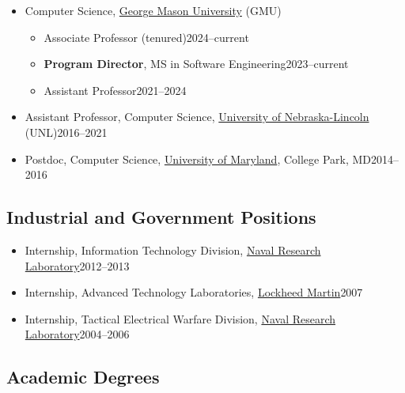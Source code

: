 \documentclass[11pt]{article}
\begin{document}
\begin{itemize}
    \item Computer Science, \href{https://cs.gmu.edu}{George Mason University} (GMU)
    \begin{itemize}
        \item Associate Professor (tenured)\hfill 2024--current
        \item \textbf{Program Director}, MS in Software Engineering\hfill 2023--current
        \item Assistant Professor\hfill 2021--2024
        
    \end{itemize}
    
    \item Assistant Professor, Computer Science, \href{https://computing.unl.edu}{University of Nebraska-Lincoln} (UNL)\hfill 2016--2021
    
    \item Postdoc, Computer Science,  \href{https://www.umd.edu}{University of Maryland}, College Park, MD\hfill 2014--2016
    
    
\end{itemize}

\subsection{Industrial and Government Positions}
\begin{itemize}
    \item Internship, Information Technology Division, \href{https://www.nrl.navy.mil}{Naval Research Laboratory}\hfill 2012--2013
    \item Internship, Advanced Technology Laboratories, \href{https://lockheedmartin.com/en-us/capabilities/research-labs/advanced-technology-labs.html}{Lockheed Martin}\hfill 2007
    \item Internship, Tactical Electrical Warfare Division,  \href{https://www.nrl.navy.mil}{Naval Research Laboratory}\hfill 2004--2006
\end{itemize}

\subsection{Academic Degrees}
\end{document}
